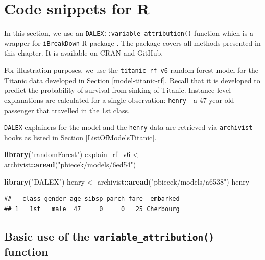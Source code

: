 \documentclass[]{krantz}
\newenvironment{Shaded}{\begin{snugshade}}{\end{snugshade}}
\newcommand{\KeywordTok}[1]{\textcolor[rgb]{0.13,0.29,0.53}{\textbf{#1}}}
\newcommand{\NormalTok}[1]{#1}
\newcommand{\OperatorTok}[1]{\textcolor[rgb]{0.81,0.36,0.00}{\textbf{#1}}}
\newcommand{\StringTok}[1]{\textcolor[rgb]{0.31,0.60,0.02}{#1}}
\begin{document}
\hypertarget{BDR}{%
\section{Code snippets for R}\label{BDR}}

In this section, we use an \texttt{DALEX::variable\_attribution()} function which is a wrapper for \texttt{iBreakDown} R package \citep{iBreakDownRPackage}. The package covers all methods presented in this chapter. It is available on CRAN and GitHub.

For illustration purposes, we use the \texttt{titanic\_rf\_v6} random-forest model for the Titanic data developed in Section \ref{model-titanic-rf}. Recall that it is developed to predict the probability of survival from sinking of Titanic. Instance-level explanations are calculated for a single observation: \texttt{henry} - a 47-year-old passenger that travelled in the 1st class.

\texttt{DALEX} explainers for the model and the \texttt{henry} data are retrieved via \texttt{archivist} hooks as listed in Section \ref{ListOfModelsTitanic}.

\begin{Shaded}
\begin{Highlighting}[]
\KeywordTok{library}\NormalTok{(}\StringTok{"randomForest"}\NormalTok{)}
\NormalTok{explain_rf_v6 <-}\StringTok{ }\NormalTok{archivist}\OperatorTok{::}\KeywordTok{aread}\NormalTok{(}\StringTok{"pbiecek/models/6ed54"}\NormalTok{)}

\KeywordTok{library}\NormalTok{(}\StringTok{"DALEX"}\NormalTok{)}
\NormalTok{henry <-}\StringTok{ }\NormalTok{archivist}\OperatorTok{::}\KeywordTok{aread}\NormalTok{(}\StringTok{"pbiecek/models/a6538"}\NormalTok{)}
\NormalTok{henry}
\end{Highlighting}
\end{Shaded}

\begin{verbatim}
##   class gender age sibsp parch fare  embarked
## 1   1st   male  47     0     0   25 Cherbourg
\end{verbatim}

\hypertarget{basic-use-of-the-variable_attribution-function}{%
\subsection{\texorpdfstring{Basic use of the \texttt{variable\_attribution()} function}{Basic use of the variable\_attribution() function}}\label{basic-use-of-the-variable_attribution-function}}
\end{document}
